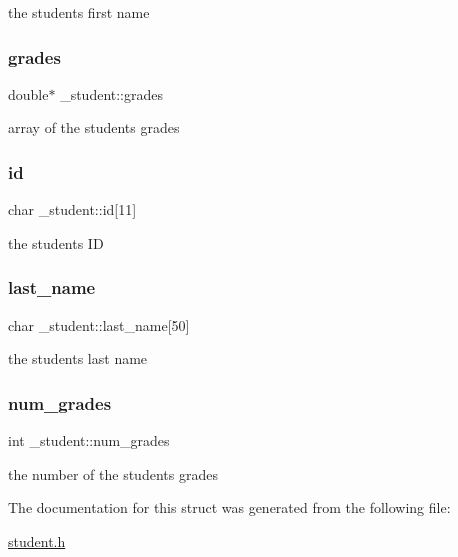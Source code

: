 the student\textquotesingle{}s first name \mbox{\label{struct__student_ad0f75a9ff0f6104eb9e3bb3c4f7ad97b}} 
\subsubsection{\texorpdfstring{grades}{grades}}
{\footnotesize\ttfamily double$\ast$ \+\_\+student\+::grades}

array of the student\textquotesingle{}s grades \mbox{\label{struct__student_adaee78078859cdecdbe9128dd655b748}} 
\subsubsection{\texorpdfstring{id}{id}}
{\footnotesize\ttfamily char \+\_\+student\+::id\mbox{[}11\mbox{]}}

the student\textquotesingle{}s ID \mbox{\label{struct__student_a18eb2a90671a2292c017b8f4fbde7eec}} 
\subsubsection{\texorpdfstring{last\+\_\+name}{last\_name}}
{\footnotesize\ttfamily char \+\_\+student\+::last\+\_\+name\mbox{[}50\mbox{]}}

the student\textquotesingle{}s last name \mbox{\label{struct__student_a6592ee968ed2226737f45243e7602636}} 
\subsubsection{\texorpdfstring{num\+\_\+grades}{num\_grades}}
{\footnotesize\ttfamily int \+\_\+student\+::num\+\_\+grades}

the number of the student\textquotesingle{}s grades 

The documentation for this struct was generated from the following file\+:\begin{DoxyCompactItemize}
\item 
\mbox{\hyperlink{student_8h}{student.\+h}}\end{DoxyCompactItemize}
